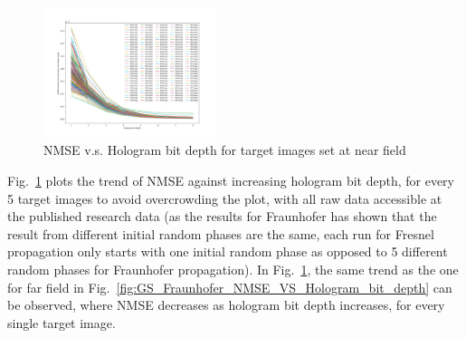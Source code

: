	\begin{figure} [ht]
	   \begin{center}
	   \includegraphics[trim={80 50 90 70}, clip, width = 0.45\textwidth]{GS_Fraunhofer_NMSE_VS_Hologram bit depth.png}
	   \end{center}
	   \caption{\label{fig:GS_Fresnel0.1_NMSE_VS_Hologram_bit_depth} NMSE v.s. Hologram bit depth for target images set at near field}
	\end{figure}
	
	Fig.~\ref{fig:GS_Fresnel0.1_NMSE_VS_Hologram_bit_depth} plots the trend of NMSE against increasing hologram bit depth, for every 5 target images to avoid overcrowding the plot, with all raw data accessible at the published research data \cite{research_data_Sha2024} (as the results for Fraunhofer has shown that the result from different initial random phases are the same, each run for Fresnel propagation only starts with one initial random phase as opposed to 5 different random phases for Fraunhofer propagation). In Fig.~\ref{fig:GS_Fresnel0.1_NMSE_VS_Hologram_bit_depth}, the same trend as the one for far field in Fig.~\ref{fig:GS_Fraunhofer_NMSE_VS_Hologram_bit_depth} can be observed, where NMSE decreases as hologram bit depth increases, for every single target image.
	
